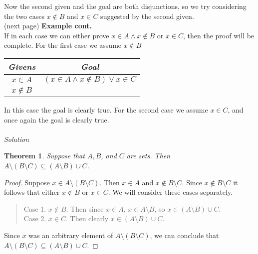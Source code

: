 \documentclass{report}
\newtheorem*{theorem}{Theorem}
\theoremstyle{definition}
\begin{document}
Now the second given and the goal are both disjunctions, so we try considering the two cases $x\notin B$ and $x\in C$ suggested by the second given.\\
(next page)\newpage
\noindent\textbf{Example cont.}\\
If in each case we can either prove $x\in A\land x\notin B$ or $x\in C$, then the proof will be complete. For the first case we assume $x\notin B$
\begin{center}
\begin{tabular}{c|c}
\textit{Givens}&\textit{Goal}\\
\hline
$x\in A$&$(x\in A\land x\notin B)\lor x\in C$\\
$x\notin B$&
\end{tabular}
\end{center}
In this case the goal is clearly true. For the second case we assume $x\in C$, and once again the goal is clearly true.\\
\vspace{1mm}\\
\textit{Solution}
\begin{theorem}
Suppose that $A,B$, and $C$ are sets. Then $A\setminus(B\setminus C)\subseteq(A\setminus B)\cup C$.
\end{theorem}
\begin{proof}
Suppose $x\in A\setminus(B\setminus C)$. Then $x\in A$ and $x\notin B\setminus C$. Since $x\notin B\setminus C$ it follows that either $x\notin B$ or $x\in C$. We will consider these
cases separately.
\begin{quote}
Case 1. $x\notin B$. Then since $x\in A$, $x\in A\setminus B$, so $x\in(A\setminus B)\cup C$.\\
Case 2. $x\in C$. Then clearly $x\in(A\setminus B)\cup C$.
\end{quote}
Since $x$ was an arbitrary element of $A\setminus(B\setminus C)$, we can conclude that $A\setminus(B\setminus C)\subseteq(A\setminus B)\cup C$.
\end{proof}
\end{document}

